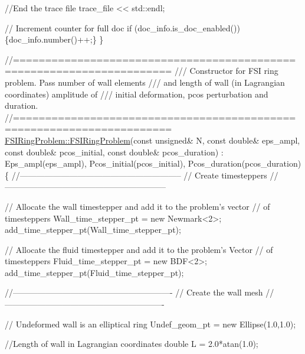 \begin{DoxyCodeInclude}
{  \textcolor{comment}{//End the trace file}
  trace\_file << std::endl;
  
  \textcolor{comment}{// Increment counter for full doc}
  \textcolor{keywordflow}{if} (doc\_info.is\_doc\_enabled()) \{doc\_info.number()++;\}
\}

\textcolor{comment}{//======================================================================}\textcolor{comment}{}
\textcolor{comment}{/// Constructor for FSI ring problem. Pass number of wall elements}
\textcolor{comment}{/// and length of wall (in Lagrangian coordinates)  amplitude of }
\textcolor{comment}{/// initial deformation, pcos perturbation and duration.}
\textcolor{comment}{}\textcolor{comment}{//======================================================================}
\hyperlink{classFSIRingProblem_a8f4969c6397bebe8afa2b9285ec908e6}{FSIRingProblem::FSIRingProblem}(\textcolor{keyword}{const} \textcolor{keywordtype}{unsigned}& N,
                \textcolor{keyword}{const} \textcolor{keywordtype}{double}& eps\_ampl, \textcolor{keyword}{const} \textcolor{keywordtype}{double}& pcos\_initial,
                \textcolor{keyword}{const} \textcolor{keywordtype}{double}& pcos\_duration) : 
 Eps\_ampl(eps\_ampl), Pcos\_initial(pcos\_initial), 
 Pcos\_duration(pcos\_duration)
\{
 \textcolor{comment}{//----------------------------------------------------------- }
 \textcolor{comment}{// Create timesteppers}
 \textcolor{comment}{//-----------------------------------------------------------}
 
 \textcolor{comment}{// Allocate the wall timestepper and add it to the problem's vector}
 \textcolor{comment}{// of timesteppers}
 Wall\_time\_stepper\_pt = \textcolor{keyword}{new} Newmark<2>;
 add\_time\_stepper\_pt(Wall\_time\_stepper\_pt);

 \textcolor{comment}{// Allocate the fluid timestepper and add it to the problem's Vector}
 \textcolor{comment}{// of timesteppers}
 Fluid\_time\_stepper\_pt = \textcolor{keyword}{new} BDF<2>;
 add\_time\_stepper\_pt(Fluid\_time\_stepper\_pt);

 \textcolor{comment}{//----------------------------------------------------------}
 \textcolor{comment}{// Create the wall mesh}
 \textcolor{comment}{//----------------------------------------------------------}

 \textcolor{comment}{// Undeformed wall is an elliptical ring}
 Undef\_geom\_pt = \textcolor{keyword}{new} Ellipse(1.0,1.0); 

 \textcolor{comment}{//Length of wall in Lagrangian coordinates}
 \textcolor{keywordtype}{double} L = 2.0*atan(1.0);

}
\end{DoxyCodeInclude}
